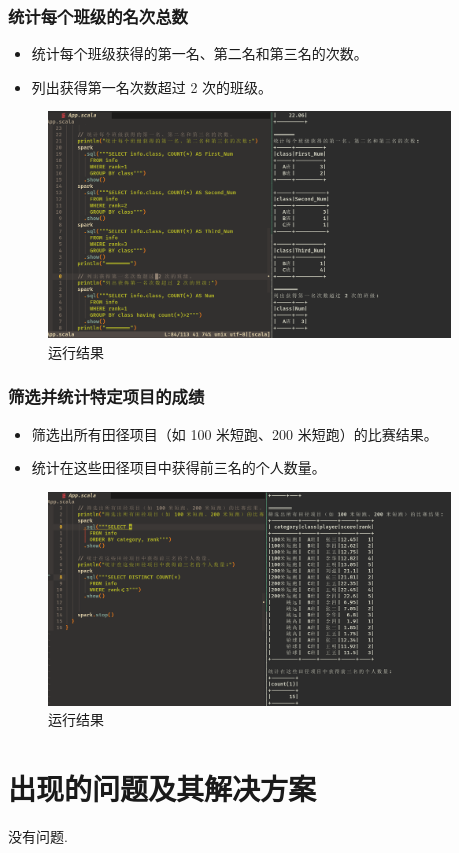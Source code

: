 \documentclass{article}
\begin{document}
\subsubsection{统计每个班级的名次总数}
\begin{itemize}
  \item 统计每个班级获得的第一名、第二名和第三名的次数。
  \item 列出获得第一名次数超过 2 次的班级。
\end{itemize}

\begin{figure}[H]
  \begin{center}
    \includegraphics[width=0.95\textwidth]{./figures/2-2.png}
  \end{center}
  \caption{运行结果}
\end{figure}

\subsubsection{筛选并统计特定项目的成绩}
\begin{itemize}
  \item 筛选出所有田径项目（如 100 米短跑、200 米短跑）的比赛结果。
  \item 统计在这些田径项目中获得前三名的个人数量。
\end{itemize}

\begin{figure}[H]
  \begin{center}
    \includegraphics[width=0.95\textwidth]{./figures/2-3.png}
  \end{center}
  \caption{运行结果}
\end{figure}

\section{出现的问题及其解决方案}
没有问题.
\end{document}
